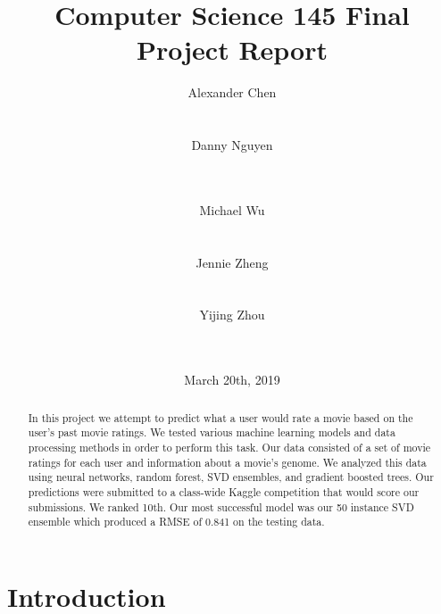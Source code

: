 \documentclass{sig-alternate-05-2015}
\begin{document}
\title{Computer Science 145 Final Project Report}
\date{March 20th, 2019}
\author{
    \alignauthor
    Alexander Chen\\
    \\
    \\
    \alignauthor
    Danny Nguyen\\
    \\
    \\
    \and
    \alignauthor
    Michael Wu\\
    \\
    \\
    \alignauthor
    Jennie Zheng\\
    \\
    \\
    \alignauthor
    Yijing Zhou\\
    \\
    \\
}
\maketitle

\begin{abstract}
In this project we attempt to predict what a user would rate a movie based on the user's past
movie ratings. We tested various machine learning models and data processing methods in order to
perform this task. Our data consisted of a set of movie ratings for each user and information
about a movie's genome. We analyzed this data using neural networks, random forest, SVD ensembles,
and gradient boosted trees. Our predictions were submitted to a class-wide Kaggle competition
that would score our submissions. We ranked 10th. Our most successful model was our 50 instance
SVD ensemble which produced a RMSE of 0.841 on the testing data.
\end{abstract}

\section{Introduction}
\end{document}
